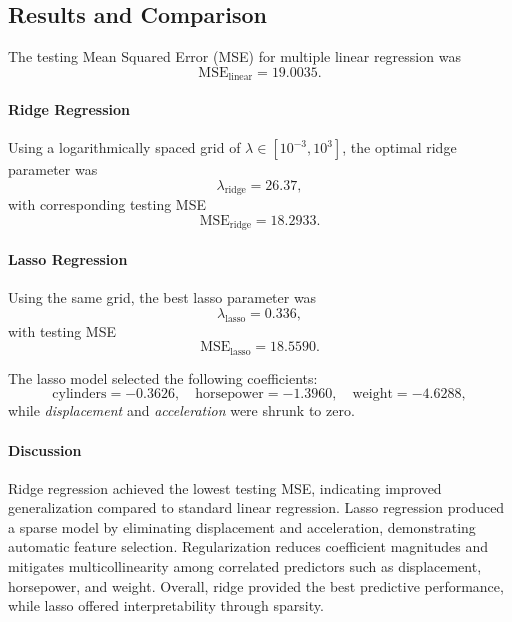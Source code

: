 \documentclass[11pt]{article}
\begin{document}
\subsection*{Results and Comparison}

The testing Mean Squared Error (MSE) for multiple linear regression was
\[
\text{MSE}_{\text{linear}} = 19.0035.
\]

\paragraph{Ridge Regression}
Using a logarithmically spaced grid of $\lambda\in[10^{-3},10^{3}]$, the optimal ridge parameter was
\[
\lambda_{\text{ridge}} = 26.37,
\]
with corresponding testing MSE
\[
\text{MSE}_{\text{ridge}} = 18.2933.
\]

\paragraph{Lasso Regression}
Using the same grid, the best lasso parameter was
\[
\lambda_{\text{lasso}} = 0.336,
\]
with testing MSE
\[
\text{MSE}_{\text{lasso}} = 18.5590.
\]

The lasso model selected the following coefficients:
\[
\text{cylinders}=-0.3626,\quad
\text{horsepower}=-1.3960,\quad
\text{weight}=-4.6288,
\]
while \textit{displacement} and \textit{acceleration} were shrunk to zero.

\paragraph{Discussion}
Ridge regression achieved the lowest testing MSE, indicating improved generalization compared to standard linear regression.
Lasso regression produced a sparse model by eliminating displacement and acceleration, demonstrating automatic feature selection.
Regularization reduces coefficient magnitudes and mitigates multicollinearity among correlated predictors such as displacement, horsepower, and weight.
Overall, ridge provided the best predictive performance, while lasso offered interpretability through sparsity.
\end{document}
